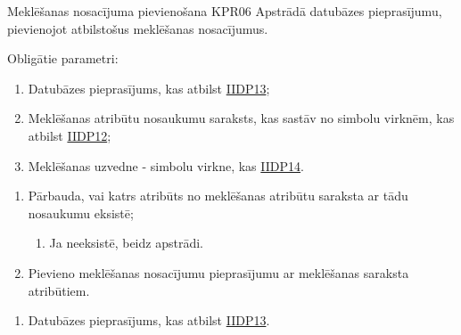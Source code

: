 \procedureTable
{Meklēšanas nosacījuma pievienošana}
{KPR06}
{
	Apstrādā datubāzes pieprasījumu, pievienojot atbilstošus meklēšanas nosacījumus.
}
{
	Obligātie parametri:
	\begin{enumerate}
		\item Datubāzes pieprasījums, kas atbilst \hyperref[tab:IIDP13]{IIDP13};
		\item Meklēšanas atribūtu nosaukumu saraksts, kas sastāv no simbolu virknēm, kas atbilst \hyperref[tab:IIDP12]{IIDP12};
		\item Meklēšanas uzvedne - simbolu virkne, kas \hyperref[tab:IIDP14]{IIDP14}.
	\end{enumerate}
}
{
	\begin{enumerate}
		\item Pārbauda, vai katrs atribūts no meklēšanas atribūtu saraksta ar tādu nosaukumu eksistē;
		      \begin{enumerate}
			      \item Ja neeksistē, beidz apstrādi.
		      \end{enumerate}
		\item Pievieno meklēšanas nosacījumu pieprasījumu ar meklēšanas saraksta atribūtiem.
	\end{enumerate}
}
{
	\begin{enumerate}
		\item Datubāzes pieprasījums, kas atbilst \hyperref[tab:IIDP13]{IIDP13}.
	\end{enumerate}
}
